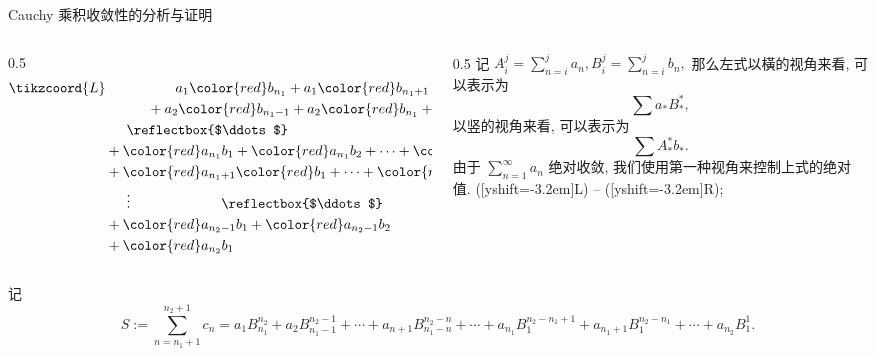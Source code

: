 
\begin{frame}{Cauchy 乘积收敛性的分析与证明}

\begin{columns}
\begin{column}{0.5\textwidth}
\begin{align*}
\tikzcoord{L} & \hspace{5em} a_1 {\color{red} b_{n_1}} + a_1 {\color{red} b_{n_1+1}} + \cdots + a_1 {\color{red} b_{n_2}} \tikzcoord{R} \\
& \hspace{3em} + a_2 {\color{red} b_{n_1-1}} + a_2 {\color{red} b_{n_1}} + \cdots + a_2 {\color{red} b_{n_2-1}} \\
& \hspace{1.5em} \reflectbox{$\ddots$} \hspace{11.5em} \reflectbox{$\ddots$} \\
& + {\color{red} a_{n_1}} b_1 + {\color{red} a_{n_1}} b_2 + \cdots + {\color{red} a_{n_1}} {\color{red} b_{n_2 - n_1 + 1}} \\
& + {\color{red} a_{n_1+1}} {\color{red} b_1} + \cdots + {\color{red} a_{n_1+1}} {\color{red} b_{n_2 - n_1}} \\
& \hspace{1.5em} \vdots \hspace{6.5em} \reflectbox{$\ddots$} \\
& + {\color{red} a_{n_2-1}} b_1 + {\color{red} a_{n_2-1}} b_2 \\
& + {\color{red} a_{n_2}} b_1
\end{align*}
\end{column}
\pause
\begin{column}{0.5\textwidth}
记 $A_{i}^{j} = \sum\limits_{n=i}^{j} a_n, B_{i}^{j} = \sum\limits_{n=i}^{j} b_n,$ 那么左式以橫的视角来看, 可以表示为
\[
\sum a_* B_*^*,
\]
以竖的视角来看, 可以表示为
\[
\sum A_*^* b_*.
\]
\pause
由于 $\sum\limits_{n=1}^\infty a_n$ 绝对收敛, 我们使用第一种视角来控制上式的绝对值.
{  ([yshift=-3.2em]L) -- ([yshift=-3.2em]R);}
\end{column}
\end{columns}

\pause

记
\[
S := \sum\limits_{n=n_1+1}^{n_2+1} c_n = a_1 B_{n_1}^{n_2} + a_2 B_{n_1-1}^{n_2-1} + \cdots + a_{n+1} B_{n_1-n}^{n_2-n} + \cdots + a_{n_1} B_1^{n_2-n_1+1} + a_{n_1+1} B_1^{n_2-n_1} + \cdots + a_{n_2} B_1^1.
\]

\end{frame}

